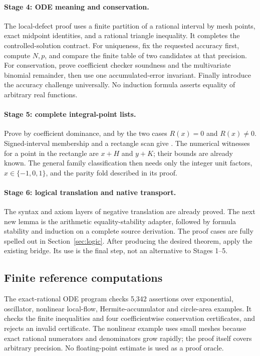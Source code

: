 \paragraph{Stage 4: ODE meaning and conservation.}
The local-defect proof uses a finite partition of a rational interval by
mesh points, exact midpoint identities, and a rational triangle inequality.
It completes the controlled-solution contract. For uniqueness, fix the
requested accuracy first, compute $N,p$, and compare the finite table of
two candidates at that precision. For conservation, prove coefficient
checker soundness and the multivariate binomial remainder, then use one
accumulated-error invariant. Finally introduce the accuracy challenge
universally. No induction formula asserts equality of arbitrary real
functions.

\paragraph{Stage 5: complete integral-point lists.}
Prove  by coefficient dominance, and
 by the two cases $R(x)=0$ and $R(x)\ne0$.
Signed-interval membership and a rectangle scan give
. The numerical witnesses for a point in
the rectangle are $x+H$ and $y+K$; their bounds are already known.
The general family classification then needs only the integer unit
factors, $x\in\{-1,0,1\}$, and the parity fold described in its proof.

\paragraph{Stage 6: logical translation and native transport.}
The syntax and axiom layers of negative translation are already proved.
The next new lemma is the arithmetic equality-stability adapter, followed
by formula stability and induction on a complete source derivation.
The proof cases are fully spelled out in Section~\ref{sec:logic}.
After producing the desired  theorem, apply the existing
 bridge. Its use is the final step, not an
alternative to Stages 1--5.

\subsection{Finite reference computations}

The exact-rational ODE program checks 5,342 assertions over exponential,
oscillator, nonlinear local-flow, Hermite-accumulator and circle-area
examples. It checks the finite inequalities and four coefficientwise
conservation certificates, and rejects an invalid certificate. The
nonlinear example uses small meshes because exact rational numerators and
denominators grow rapidly; the proof itself covers arbitrary precision.
No floating-point estimate is used as a proof oracle.

